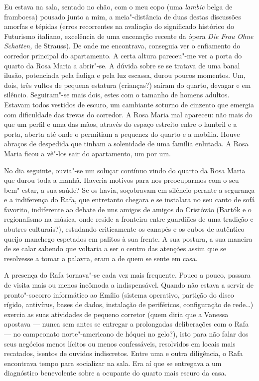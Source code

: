 Eu estava na sala, sentado no chão, com o meu copo (uma
\emph{lambic }belga de framboesa) pousado junto a mim, a meia"-distância de duas destas discussões amorfas e tépidas (erros
recorrentes na avaliação do significado histórico do Futurismo italiano,
excelência de uma encenação recente da ópera \emph{Die Frau Ohne
Schatten, }de Strauss). De onde me encontrava, conseguia ver o
enfiamento do corredor principal do apartamento. A certa altura
pareceu"-me ver a porta do quarto da Rosa Maria a abrir"-se. A dúvida
sobre se se tratava de uma banal ilusão, potenciada pela fadiga e pela
luz escassa, durou poucos momentos. Um, dois, três vultos de pequena
estatura (crianças?) saíram do quarto, devagar e em silêncio. Seguiram"-se mais dois,
estes com o tamanho de homens adultos. Estavam todos vestidos de escuro,
um cambiante soturno de cinzento que emergia com dificuldade das trevas
do corredor. A Rosa Maria mal apareceu: não mais do que um perfil e uma
das mãos, através do espaço estreito entre o lambril e a porta, aberta
até onde o permitiam a pequenez do quarto e a mobília. Houve abraços de
despedida que tinham a solenidade de uma família enlutada. A Rosa Maria
ficou a vê"-los sair do apartamento, um por um.

No dia seguinte, ouvia"-se um soluçar contínuo vindo do quarto da Rosa
Maria que durou toda a manhã. Haveria motivos para nos preocuparmos
com o seu bem"-estar, a sua saúde? Se os havia, soçobravam em silêncio
perante a segurança e a indiferença do Rafa, que entretanto chegara e se
instalara no seu canto de sofá favorito, indiferente ao debate de uns
amigos de amigos do Cristóvão (Bartók e o regionalismo na música, onde
reside a fronteira entre guardiães de uma tradição e abutres
culturais?), estudando criticamente os canapés e os cubos de autêntico
queijo manchego espetados em palitos à sua frente. A sua postura, a sua
maneira de se calar sabendo que voltaria a ser o centro das atenções
assim que se resolvesse a tomar a palavra, eram a de quem se sente em
casa.

A presença do Rafa tornava"-se cada vez mais frequente. Pouco a pouco,
passara de visita mais ou menos incômoda a indispensável. Quando não
estava a servir de pronto"-socorro informático ao Emílio (sistema
operativo, partição do disco rígido, antivírus, bases de dados,
instalação de periféricos, configuração de rede\ldots{}) exercia as suas
atividades de pequeno corretor (quem diria que a Vanessa apostava ---
nunca sem antes se entregar a prolongadas deliberações com o Rafa --- no
campeonato norte"-americano de hóquei no gelo?), isto para não falar dos
seus negócios menos lícitos ou menos confessáveis, resolvidos em
locais mais recatados, isentos de ouvidos indiscretos. Entre uma e outra
diligência, o Rafa encontrava tempo para socializar na sala. Era aí que
se entregava a um diagnóstico benevolente sobre a ocupante do quarto
mais escuro da casa.

